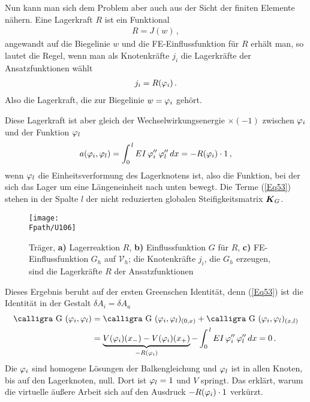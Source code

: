 {{{Nun kann man sich dem Problem aber auch aus der Sicht der finiten Elemente n\"{a}hern. Eine Lagerkraft $R$ ist ein Funktional
\begin{align}
R = J(w)\,,
\end{align}
angewandt auf die Biegelinie $w$ und die FE-Einflussfunktion f\"{u}r $R$ erh\"{a}lt man, so lautet die Regel, wenn man als Knotenkr\"{a}fte $j_i$ die Lagerkr\"{a}fte der Ansatzfunktionen w\"{a}hlt
\begin{align}
j_i = R(\varphi_i)\,.
\end{align}
Also die Lagerkraft, die zur Biegelinie $w = \varphi_i$ geh\"{o}rt.

Diese Lagerkraft ist aber gleich der Wechselwirkungsenergie $\times (-1)$ zwischen $\varphi_i $ und der Funktion $\varphi_l$
\begin{align}\label{Eq53}
a(\varphi_i,\varphi_l) = \int_0^{\,l} EI\,\varphi_i''\,\varphi_l''\, dx = - R(\varphi_i) \cdot 1\,,
\end{align}
wenn $\varphi_l$ die Einheitsverformung des Lagerknotens ist, also die Funktion, bei der sich das Lager um eine L\"{a}ngeneinheit nach unten bewegt. Die Terme (\ref{Eq53}) stehen in der Spalte $l$ der nicht reduzierten globalen Steifigkeitsmatrix $\mbox{\boldmath $K$}_G$.

\begin{figure}[tbp]
\centering
\texttt{[image: \\Fpath/U106]}
\caption{Tr\"{a}ger, \textbf{ a)} Lagerreaktion $R$, \textbf{ b)} Einflussfunktion $G$ f\"{u}r $R$, \textbf{ c)} FE-Einflussfunktion $G_h$ auf $\mathcal{V}_h$; die Knotenkr\"{a}fte $j_i$, die $G_h$ erzeugen, sind die Lagerkr\"{a}fte $R$ der Ansatzfunktionen} \label{U106}
\end{figure}%

Dieses Ergebnis beruht auf der ersten Greenschen Identit\"{a}t, denn (\ref{Eq53}) ist die Identit\"{a}t in der Gestalt $\delta A_i = \delta A_a$
\begin{align}
\text{\normalfont\calligra G\,\,}(\Np_i,\Np_l) &= \text{\normalfont\calligra G\,\,}(\Np_i,\Np_l)_{(0,x)} + \text{\normalfont\calligra G\,\,}(\Np_i,\Np_l)_{(x,l)}\nn \\
&=\underbrace{V(\Np_i)(x_{-}) - V(\Np_i)(x_{+})}_{-R(\Np_i)} -\int_0^{\,l} EI\,\Np_i''\,\Np_l''\, dx = 0\,.
\end{align}
Die $\varphi_i $ sind homogene L\"{o}sungen der Balkengleichung und $\varphi_l$ ist in allen Knoten, bis auf den Lagerknoten, null. Dort ist $\varphi_l = 1$ und $V$ springt. Das erkl\"{a}rt, warum die virtuelle \"{a}u{\ss}ere Arbeit sich auf den Ausdruck $ -R(\varphi_i) \cdot 1$ verk\"{u}rzt.

}}}
